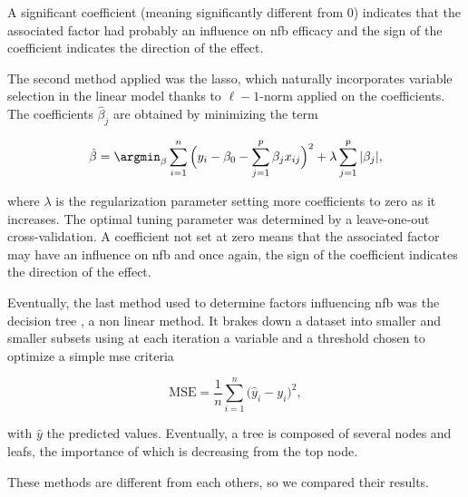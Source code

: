 A significant coefficient (meaning significantly different from 0) indicates that the associated factor had probably an influence on \gls{nfb} efficacy and the sign 
of the coefficient indicates the direction of the effect.

The second method applied was the \gls{lasso}, which naturally incorporates variable selection 
in the linear model thanks to $\ell-1$-norm applied on the coefficients. The coefficients $\hat{\beta}_j$ are obtained by minimizing the term

\begin{equation}
\label{eq:factors_lasso-minimization}
\hat{\beta} = \argmin_\beta \sum_{i=1}^{n} \Big(y_i - \beta_{0} - \sum_{j=1}^{p}\beta_{j}x_{ij}\Big)^2 + \lambda \sum_{j=1}^{p}|\beta_{j}|,
\end{equation} 

where $\lambda$ is the regularization parameter setting more coefficients to zero as it increases. The optimal tuning parameter was determined 
by a leave-one-out cross-validation. A coefficient not set at zero means that the associated factor may have an influence on \gls{nfb} and once again,
the sign of the coefficient indicates the direction of the effect.

Eventually, the last method used to determine factors influencing \gls{nfb} was the decision tree \citep{Quinlan1986}, a non linear method. It brakes down a dataset into smaller
and smaller subsets using at each iteration a variable and a threshold chosen to optimize a simple \gls{mse} criteria 

\begin{equation}
\label{eq:factors_decision_tree_mse}
\text{MSE} = \frac{1}{n}\sum_{i=1}^{n} \Big(\hat{y}_i - {y}_i\Big)^2,
\end{equation}

with $\hat{y}$ the predicted values.
Eventually, a tree is composed of several nodes and leafs, the importance of which is decreasing from the top node. 

These methods are different from each others, so we compared their results.















